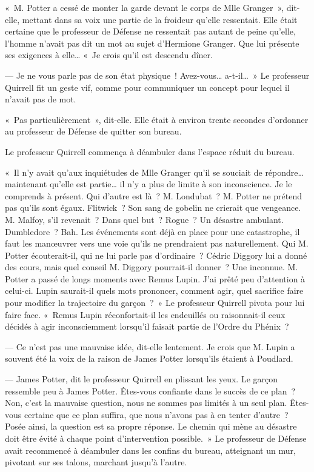 «~M. Potter a cessé de monter la garde devant le corps de Mlle Granger~», dit-elle, mettant dans sa voix une partie de la froideur qu'elle ressentait. Elle était certaine que le professeur de Défense ne ressentait pas autant de peine qu'elle, l'homme n'avait pas dit un mot au sujet d'Hermione Granger. Que lui présente ses exigences à elle… «~Je crois qu'il est descendu dîner.

--- Je ne vous parle pas de son état physique~! Avez-vous… a-t-il…~» Le professeur Quirrell fit un geste vif, comme pour communiquer un concept pour lequel il n'avait pas de mot.

«~Pas particulièrement~», dit-elle. Elle était à environ trente secondes d'ordonner au professeur de Défense de quitter son bureau.

Le professeur Quirrell commença à déambuler dans l'espace réduit du bureau.

«~Il n'y avait qu'aux inquiétudes de Mlle Granger qu'il se souciait de répondre… maintenant qu'elle est partie… il n'y a plus de limite à son inconscience. Je le comprends à présent. Qui d'autre est là~? M. Londubat~? M. Potter ne prétend pas qu'ils sont égaux. Flitwick~? Son sang de gobelin ne crierait que vengeance. M. Malfoy, s'il revenait~? Dans quel but~? Rogue~? Un désastre ambulant. Dumbledore~? Bah. Les événements sont déjà en place pour une catastrophe, il faut les manœuvrer vers une voie qu'ils ne prendraient pas naturellement. Qui M. Potter écouterait-il, qui ne lui parle pas d'ordinaire~? Cédric Diggory lui a donné des cours, mais quel conseil M. Diggory pourrait-il donner~? Une inconnue. M. Potter a passé de longs moments avec Remus Lupin. J'ai prêté peu d'attention à celui-ci. Lupin saurait-il quels mots prononcer, comment agir, quel sacrifice faire pour modifier la trajectoire du garçon~?~» Le professeur Quirrell pivota pour lui faire face. «~Remus Lupin réconfortait-il les endeuillés ou raisonnait-il ceux décidés à agir inconsciemment lorsqu'il faisait partie de l'Ordre du Phénix~?

--- Ce n'est pas une mauvaise idée, dit-elle lentement. Je crois que M. Lupin a souvent été la voix de la raison de James Potter lorsqu'ils étaient à Poudlard.

--- James Potter, dit le professeur Quirrell en plissant les yeux. Le garçon ressemble peu à James Potter. Êtes-vous confiante dans le succès de ce plan~? Non, c'est la mauvaise question, nous ne sommes pas limités à un seul plan. Êtes-vous certaine que ce plan suffira, que nous n'avons pas à en tenter d'autre~? Posée ainsi, la question est sa propre réponse. Le chemin qui mène au désastre doit être évité à chaque point d'intervention possible.~» Le professeur de Défense avait recommencé à déambuler dans les confins du bureau, atteignant un mur, pivotant sur ses talons, marchant jusqu'à l'autre.

